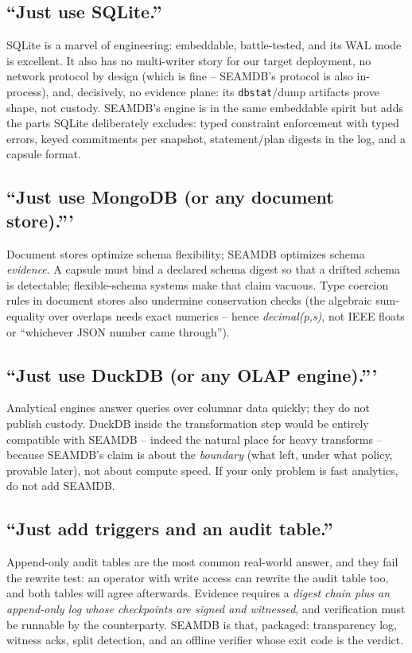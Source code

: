 \documentclass[11pt]{article}
\newcommand{\code}[1]{\texttt{#1}}
\begin{document}
\subsection{``Just use SQLite.''}
SQLite is a marvel of engineering: embeddable, battle-tested, and its WAL
mode is excellent. It also has no multi-writer story for our target
deployment, no network protocol by design (which is fine -- SEAMDB's
protocol is also in-process), and, decisively, no evidence plane: its
\code{dbstat}/dump artifacts prove shape, not custody. SEAMDB's engine is in
the same embeddable spirit but adds the parts SQLite deliberately excludes:
typed constraint enforcement with typed errors, keyed commitments per
snapshot, statement/plan digests in the log, and a capsule format.

\subsection{``Just use MongoDB (or any document store).'''}
Document stores optimize schema flexibility; SEAMDB optimizes schema
\emph{evidence}. A capsule must bind a declared schema digest so that a
drifted schema is detectable; flexible-schema systems make that claim
vacuous. Type coercion rules in document stores also undermine conservation
checks (the algebraic sum-equality over overlaps needs exact numerics --
hence \emph{decimal(p,s)}, not IEEE floats or ``whichever JSON number came
through'').

\subsection{``Just use DuckDB (or any OLAP engine).'''}
Analytical engines answer queries over columnar data quickly; they do not
publish custody. DuckDB inside the transformation step would be entirely
compatible with SEAMDB -- indeed the natural place for heavy transforms --
because SEAMDB's claim is about the \emph{boundary} (what left, under what
policy, provable later), not about compute speed. If your only problem is
fast analytics, do not add SEAMDB.

\subsection{``Just add triggers and an audit table.''}
Append-only audit tables are the most common real-world answer, and they
fail the rewrite test: an operator with write access can rewrite the audit
table too, and both tables will agree afterwards. Evidence requires a
\emph{digest chain plus an append-only log whose checkpoints are signed and
witnessed}, and verification must be runnable by the counterparty. SEAMDB is
that, packaged: transparency log, witness acks, split detection, and an
offline verifier whose exit code is the verdict.
\end{document}
